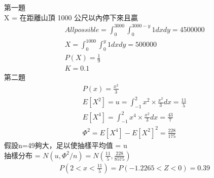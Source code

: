 \documentclass{article}
\begin{document}
\fontsize{15pt}{20pt}\selectfont

\begin{CJK}{UTF8}{bsmi} %
\noindent

第一題\\
X = 在距離山頂 1000 公尺以內停下來且贏
\begin{align*}
& All possible = \int_{0}^{3000} \int_{0}^{3000-y} 1 dxdy = 4500000\\
& X = \int_{0}^{1000} \int_{0}^{y} 1 dxdy = 500000\\
& P(X) = \frac{1}{9}\\
& K = 0.1
\end{align*}
第二題
\begin{align*}
& P(x) = \frac{x^2}{3}\\
& E[X^2] = u = \int_{-1}^{2} x^2 \times \frac{x^2}{3} dx = \frac{11}{5}\\
& E[X^4] = \int_{-1}^{2} x^4 \times \frac{x^2}{3} dx = \frac{43}{7}\\
& \Phi^2 = E[X^4]-E[X^2]^2 = \frac{228}{175}
\end{align*}
假設n=49夠大，足以使抽樣平均值 = u\\
抽樣分布 = $N(u, \Phi^2/n) = N(\frac{11}{5}, \frac{228}{8575})$
\begin{align*}
& P(2 < x < \frac{11}{5}) = P(-1.2265 < Z < 0) = 0.39\\
\end{align*}
\end{CJK} %
\end{document}
